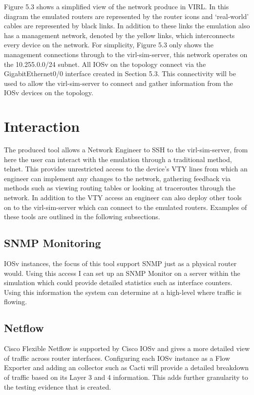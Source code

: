 \documentclass[11pt]{report}
\begin{document}
Figure 5.3 shows a simplified view of the network produce in VIRL. In this diagram the emulated routers are represented by the router icons and `real-world' cables are represented by black links. In addition to these links the emulation also has a management network, denoted by the yellow links, which interconnects every device on the network. For simplicity, Figure 5.3 only shows the management connections through to the virl-sim-server, this network operates on the 10.255.0.0/24 subnet. All IOSv on the topology connect via the GigabitEthernet0/0 interface created in Section 5.3. This connectivity will be used to allow the virl-sim-server to connect and gather information from the IOSv devices on the topology.

\section{Interaction}

The produced tool allows a Network Engineer to SSH to the virl-sim-server, from here the user can interact with the emulation through a traditional method, telnet. This provides unrestricted access to the device's VTY lines from which an engineer can implement any changes to the network, gathering feedback via methods such as viewing routing tables or looking at traceroutes through the network. In addition to the VTY access an engineer can also deploy other tools on to the virl-sim-server which can connect to the emulated routers. Examples of these tools are outlined in the following subsections.

\subsection{SNMP Monitoring}

IOSv instances, the focus of this tool support SNMP just as a physical router would. Using this access I can set up an SNMP Monitor on a server within the simulation which could provide detailed statistics such as interface counters. Using this information the system can determine at a high-level where traffic is flowing.

\subsection{Netflow}

Cisco Flexible Netflow is supported by Cisco IOSv and gives a more detailed view of traffic across router interfaces. Configuring each IOSv instance as a Flow Exporter and adding an collector such as Cacti will provide a detailed breakdown of traffic based on its Layer 3 and 4 information. This adds further granularity to the testing evidence that is created.
\end{document}
